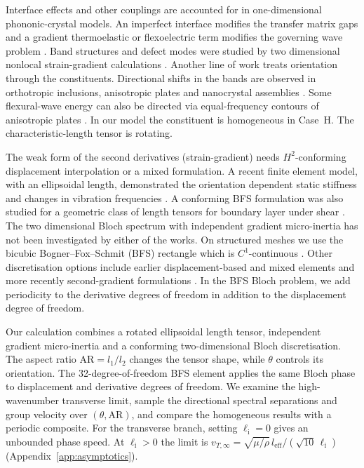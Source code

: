 Interface effects and other couplings are accounted for in one-dimensional phononic-crystal models. An imperfect interface modifies the transfer matrix gaps \cite{zhengwei2009} and a gradient thermoelastic or flexoelectric term modifies the governing wave problem \cite{li2023anchorA,li2024anchorB}. Band structures and defect modes were studied by two dimensional nonlocal strain-gradient calculations \cite{JinHuHu2022,JinHuHu2023}. Another line of work treats orientation through the constituents. Directional shifts in the bands are observed in orthotropic inclusions, anisotropic plates and nanocrystal assemblies \cite{zhanwei2010, YaoWuHouXin2011, Kim2023, Liu2024anisotropic}. Some flexural-wave energy can also be directed via equal-frequency contours of anisotropic plates \cite{Danawe2023}. In our model the constituent is homogeneous in Case~H. The characteristic-length tensor is rotating.

The weak form of the second derivatives (strain-gradient) needs $H^2$-conforming displacement interpolation or a mixed formulation. A recent finite element model, with an ellipsoidal length, demonstrated the orientation dependent static stiffness and changes in vibration frequencies \cite{GuptaKumawatYadavMaruyamaAlmohsen2027}. A conforming BFS formulation was also studied for a geometric class of length tensors for boundary layer under shear \cite{RezkKumawatLotfyYadavGupta2027}. The two dimensional Bloch spectrum with independent gradient micro-inertia has not been investigated by either of the works. On structured meshes we use the bicubic Bogner--Fox--Schmit (BFS) rectangle which is $C^1$-continuous \cite{bfs1965}. Other discretisation options include earlier displacement-based and mixed elements \cite{AmanatidouAravas2002,ZervosPapanicolopulosVardoulakis2009,AndreausDellIsolaGiorgioPlacidiLekszyckiRizzi2016} and more recently second-gradient formulations \cite{Beheshti2017,ChoiLeeSim2023,BacciocchiFantuzzi2025,Papanicolopulos2024}. In the BFS Bloch problem, we add periodicity to the derivative degrees of freedom in addition to the displacement degree of freedom.

Our calculation combines a rotated ellipsoidal length tensor, independent gradient micro-inertia and a conforming two-dimensional Bloch discretisation. The aspect ratio $\mathrm{AR}=l_1/l_2$ changes the tensor shape, while $\theta$ controls its orientation. The 32-degree-of-freedom BFS element applies the same Bloch phase to displacement and derivative degrees of freedom. We examine the high-wavenumber transverse limit, sample the directional spectral separations and group velocity over $(\theta,\mathrm{AR})$, and compare the homogeneous results with a periodic composite. For the transverse branch, setting $\ell_{\mathrm{i}}=0$ gives an unbounded phase speed. At $\ell_{\mathrm{i}}>0$ the limit is $v_{T,\infty}=\sqrt{\mu/\rho}\,l_{\mathrm{eff}}/(\sqrt{10}\,\ell_{\mathrm{i}})$ (Appendix~\ref{app:asymptotics}).

